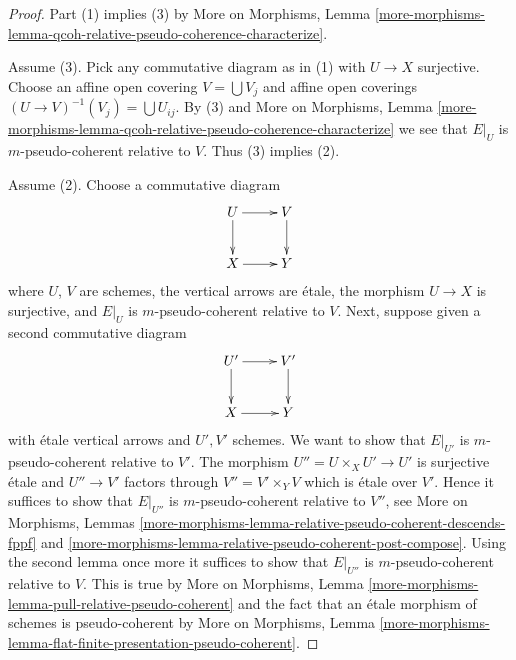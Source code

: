 \documentclass[10pt,a4paper]{amsart}
\theoremstyle{plain}
\theoremstyle{definition}
\theoremstyle{remark}
\numberwithin{equation}{subsection}
\begin{document}
\begin{proof}
Part (1) implies (3) by More on Morphisms, Lemma
\ref{more-morphisms-lemma-qcoh-relative-pseudo-coherence-characterize}.

\medskip\noindent
Assume (3). Pick any commutative diagram as in (1) with $U \to X$ surjective.
Choose an affine open covering $V = \bigcup V_j$ and affine open coverings
$(U \to V)^{-1}(V_j) = \bigcup U_{ij}$. By (3) and More on Morphisms, Lemma
\ref{more-morphisms-lemma-qcoh-relative-pseudo-coherence-characterize}
we see that $E|_U$ is $m$-pseudo-coherent relative to $V$.
Thus (3) implies (2).

\medskip\noindent
Assume (2). Choose a commutative diagram
$$
\xymatrix{
U \ar[d] \ar[r] & V \ar[d] \\
X \ar[r] & Y
}
$$
where $U$, $V$ are schemes, the vertical arrows are \'etale, the
morphism $U \to X$ is surjective, and $E|_U$ is $m$-pseudo-coherent
relative to $V$. Next, suppose given a second commutative diagram
$$
\xymatrix{
U' \ar[d] \ar[r] & V' \ar[d] \\
X \ar[r] & Y
}
$$
with \'etale vertical arrows and $U', V'$ schemes. We want to show
that $E|_{U'}$ is $m$-pseudo-coherent relative to $V'$.
The morphism $U'' = U \times_X U' \to U'$ is surjective \'etale
and $U'' \to V'$ factors through $V'' = V' \times_Y V$ which
is \'etale over $V'$. Hence it suffices to show that $E|_{U''}$
is $m$-pseudo-coherent relative to $V''$, see
More on Morphisms, Lemmas
\ref{more-morphisms-lemma-relative-pseudo-coherent-descends-fppf} and
\ref{more-morphisms-lemma-relative-pseudo-coherent-post-compose}.
Using the second lemma once more it suffices to show that
$E|_{U''}$ is $m$-pseudo-coherent relative to $V$.
This is true by More on Morphisms, Lemma
\ref{more-morphisms-lemma-pull-relative-pseudo-coherent}
and the fact that an \'etale morphism of schemes is pseudo-coherent by
More on Morphisms, Lemma
\ref{more-morphisms-lemma-flat-finite-presentation-pseudo-coherent}.
\end{proof}
\end{document}
